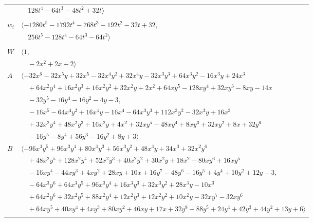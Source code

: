 \documentclass[11pt]{article}
\begin{document}
\begin{longtable}{@{}ll@{}}
 & $\quad 128t^{4}-64t^{3}-48t^{2}+32t\rangle$\\
\addlinespace[2pt]
\multicolumn{2}{@{}p{0.97\textwidth}@{}}{$i=16$, $D_i=64$, $\rho_{ij}$: $1{:}2, \allowbreak 2{:}2, \allowbreak 3{:}2, \allowbreak 18{:}1, \allowbreak 22{:}2, \allowbreak 27{:}2, \allowbreak 38{:}1, \allowbreak 43{:}2, \allowbreak 47{:}1$}\\
$w_i$ & $\langle -1280t^{5}-1792t^{4}-768t^{3}-192t^{2}-32t+32,$\\
 & $\quad 256t^{5}-128t^{4}-64t^{3}-64t^{2}\rangle$\\
\addlinespace[2pt]
\multicolumn{2}{@{}p{0.97\textwidth}@{}}{$i=17$, $D_i=4$, $\rho_{ij}$: $11{:}1, \allowbreak 23{:}1, \allowbreak 24{:}2, \allowbreak 25{:}2, \allowbreak 26{:}2, \allowbreak 45{:}1$}\\
$W$ & $\langle 1,$\\
 & $\quad -2x^{2}+2x+2\rangle$\\
$A$ & $\langle -32x^{6}-32x^{5}y+32x^{5}-32x^{4}y^{2}+32x^{4}y-32x^{3}y^{3}+64x^{3}y^{2}-16x^{3}y+24x^{3}$\\
 & $\quad +64x^{2}y^{4}+16x^{2}y^{3}+16x^{2}y^{2}+32x^{2}y+2x^{2}+64xy^{5}-128xy^{4}+32xy^{3}-8xy-14x$\\
 & $\quad -32y^{5}-16y^{4}-16y^{2}-4y-3,$\\
 & $\quad -16x^{5}-64x^{4}y^{2}+16x^{4}y-16x^{4}-64x^{3}y^{3}+112x^{3}y^{2}-32x^{3}y+16x^{3}$\\
 & $\quad +32x^{2}y^{4}+48x^{2}y^{3}+16x^{2}y+4x^{2}+32xy^{5}-48xy^{4}+8xy^{3}+32xy^{2}+8x+32y^{6}$\\
 & $\quad -16y^{5}-8y^{4}+56y^{3}-16y^{2}+8y+3\rangle$\\
$B$ & $\langle -96x^{3}y^{5}+96x^{3}y^{4}+80x^{3}y^{3}+56x^{3}y^{2}+48x^{3}y+34x^{3}+32x^{2}y^{6}$\\
 & $\quad +48x^{2}y^{5}+128x^{2}y^{4}+52x^{2}y^{3}+40x^{2}y^{2}+30x^{2}y+18x^{2}-80xy^{6}+16xy^{5}$\\
 & $\quad -16xy^{4}-44xy^{3}+4xy^{2}+28xy+10x+16y^{7}-48y^{6}-16y^{5}+4y^{4}+10y^{2}+12y+3,$\\
 & $\quad -64x^{3}y^{6}+64x^{3}y^{5}+96x^{3}y^{4}+16x^{3}y^{3}+32x^{3}y^{2}+28x^{3}y-10x^{3}$\\
 & $\quad +64x^{2}y^{6}+32x^{2}y^{5}+88x^{2}y^{4}+12x^{2}y^{3}+12x^{2}y^{2}+10x^{2}y-32xy^{7}-32xy^{6}$\\
 & $\quad +64xy^{5}+40xy^{4}+4xy^{3}+80xy^{2}+46xy+17x+32y^{8}+88y^{5}+24y^{4}+42y^{3}+44y^{2}+13y+6\rangle$\\
\addlinespace[2pt]
\multicolumn{2}{@{}p{0.97\textwidth}@{}}{$i=18$, $D_i=32$, $\rho_{ij}$: $3{:}2, \allowbreak 10{:}1, \allowbreak 12{:}1, \allowbreak 14{:}2, \allowbreak 16{:}2, \allowbreak 19{:}2, \allowbreak 22{:}2, \allowbreak 26{:}1, \allowbreak 29{:}2, \allowbreak 33{:}2, \allowbreak 37{:}1, \allowbreak 43{:}1$}\\

\end{longtable}
\end{document}
